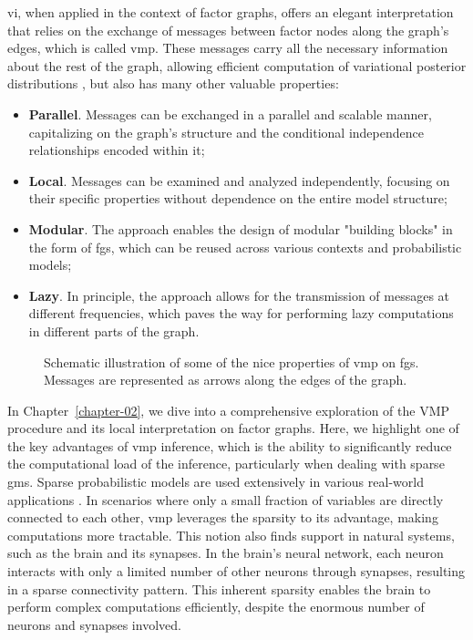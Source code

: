 \Ac{vi}, when applied in the context of factor graphs, offers an elegant interpretation that relies on the exchange of messages between factor nodes along the graph's edges, which is called \ac{vmp}. These messages carry all the necessary information about the rest of the graph, allowing efficient computation of variational posterior distributions \citep{dauwels_variational_2007}, but also has many other valuable properties:
\begin{itemize}
    \item \textbf{Parallel}. Messages can be exchanged in a parallel and scalable manner, capitalizing on the graph's structure and the conditional independence relationships encoded within it;
    \item \textbf{Local}. Messages can be examined and analyzed independently, focusing on their specific properties without dependence on the entire model structure;
    \item \textbf{Modular}. The approach enables the design of modular "building blocks" in the form of \acp{fg}, which can be
reused across various contexts and probabilistic models;
    \item \textbf{Lazy}. In principle, the approach allows for the transmission of messages at different frequencies,
which paves the way for performing lazy computations in different parts of the graph.
\end{itemize}

\begin{figure}
  \centering
  \resizebox{1.0\textwidth}{!}{}
  \caption{Schematic illustration of some of the nice properties of \ac{vmp} on \acp{fg}. Messages are represented as arrows along the edges of the graph.}
  \label{fig:intro:vmp-pros}
\end{figure}

In Chapter~\ref{chapter-02}, we dive into a comprehensive exploration of the VMP procedure and its local interpretation on factor graphs. Here, we highlight one of the key advantages of \ac{vmp} inference, which is the ability to significantly reduce the computational load of the inference, particularly when dealing with sparse \acp{gm}. Sparse probabilistic models are used extensively in various real-world applications \citep{loeliger_introduction_2004, luttinen_linear_2014, briers_smoothing_2009, wadehn_state_2019}. In scenarios where only a small fraction of variables are directly connected to each other, \ac{vmp} leverages the sparsity to its advantage, making computations more tractable. This notion also finds support in natural systems, such as the brain and its synapses. In the brain's neural network, each neuron interacts with only a limited number of other neurons through synapses, resulting in a sparse connectivity pattern. This inherent sparsity enables the brain to perform complex computations efficiently, despite the enormous number of neurons and synapses involved. 



